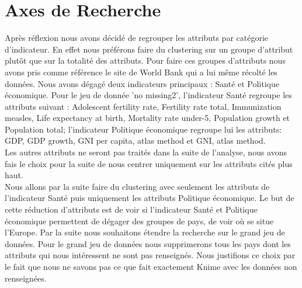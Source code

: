 \section{Axes de Recherche}
Après réflexion nous avons décidé de regrouper les attributs par catégorie d'indicateur. En effet nous préférons faire du clustering sur un groupe d'attribut plutôt que sur la totalité des attributs.
Pour faire ces groupes d'attributs nous avons pris comme référence le site de World Bank qui a lui même récolté les données. Nous avons dégagé deux indicateurs principaux : Santé et Politique économique. Pour le jeu de donnée 'no missing2', l'indicateur Santé regroupe les attributs suivant : Adolescent fertility rate, Fertility rate total, Immunization measles, Life expectancy at birth, Mortality rate under-5, Population growth et Population total; l'indicateur Politique économique regroupe lui les attributs: GDP, GDP growth, GNI per capita, atlas method et GNI, atlas method.\\
Les autres attributs ne seront pas traités dans la suite de l'analyse, nous avons fais le choix pour la suite de nous centrer uniquement sur les attributs cités plus haut.\\
Nous allons par la suite faire du clustering avec seulement les attributs de l'indicateur Santé puis uniquement les attributs Politique économique.
Le but de cette réduction d'attributs est de voir si l'indicateur Santé et Politique économique permettent de dégager des groupes de pays, de voir où se situe l'Europe. Par la suite nous souhaitons étendre la recherche sur le grand jeu de données. Pour le grand jeu de données nous supprimerons tous les pays dont les attributs qui nous intéressent ne sont pas renseignés. Nous justifions ce choix par le fait que nous ne savons pas ce que fait exactement Knime avec les données non renseignées. 